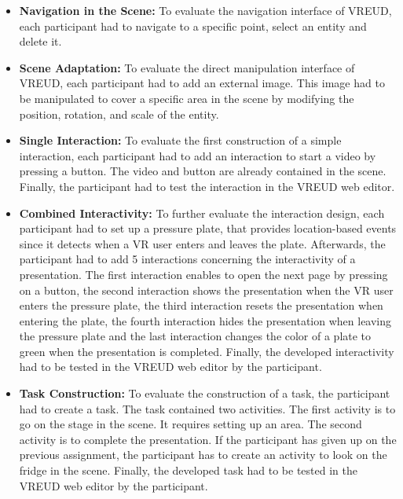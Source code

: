 \documentclass[conference]{IEEEtran}
\begin{document}
\begin{itemize}
        \item \textbf{Navigation in the Scene:} To evaluate the navigation interface of VREUD, each participant had to navigate to a specific point, select an entity and delete it.
        \item \textbf{Scene Adaptation:} To evaluate the direct manipulation interface of VREUD, each participant had to add an external image. This image had to be manipulated to cover a specific area in the scene by modifying the position, rotation, and scale of the entity. 
        \item \textbf{Single Interaction:} To evaluate the first construction of a simple interaction, each participant had to add an interaction to start a video by pressing a button. The video and button are already contained in the scene. Finally, the participant had to test the interaction in the VREUD web editor.
        \item \textbf{Combined Interactivity:} To further evaluate the interaction design, each participant had to set up a pressure plate, that provides location-based events since it detects when a \ac{VR} user enters and leaves the plate. Afterwards, the participant had to add 5 interactions concerning the interactivity of a presentation. The first interaction enables to open the next page by pressing on a button, the second interaction shows the presentation when the \ac{VR} user enters the pressure plate, the third interaction resets the presentation when entering the plate, the fourth interaction hides the presentation when leaving the pressure plate and the last interaction changes the color of a plate to green when the presentation is completed. Finally, the developed interactivity had to be tested in the VREUD web editor by the participant.
        \item \textbf{Task Construction:} To evaluate the construction of a task, the participant had to create a task. The task contained two activities. The first activity is to go on the stage in the scene. It requires setting up an area. The second activity is to complete the presentation. If the participant has given up on the previous assignment, the participant has to create an activity to look on the fridge in the scene. Finally, the developed task had to be tested in the VREUD web editor by the participant.
\end{itemize}
\end{document}
